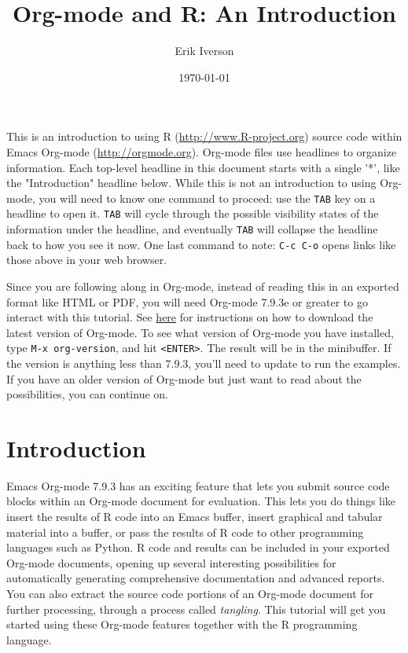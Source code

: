 \documentclass[11pt]{article}
\author{Erik Iverson}
\date{\today}
\title{Org-mode and R: An Introduction}
\begin{document}
\maketitle
\setcounter{tocdepth}{2}
\tableofcontents
\vspace*{1cm}

This is an introduction to using R (\url{http://www.R-project.org}) source code within Emacs Org-mode (\url{http://orgmode.org}). Org-mode files use headlines to organize information. Each top-level headline in this document starts with a single '*', like the "Introduction" headline below. While this is not an introduction to using Org-mode, you will need to know one command to proceed: use the \texttt{TAB} key on a headline to open it. \texttt{TAB} will cycle through the possible visibility states of the information under the headline, and eventually \texttt{TAB} will collapse the headline back to how you see it now. One last command to note: \texttt{C-c C-o} opens links like those above in your web browser.

Since you are following along in Org-mode, instead of reading this in an exported format like HTML or PDF, you will need Org-mode 7.9.3e or greater to go interact with this tutorial. See \href{http://orgmode.org/index.html#sec-3}{here} for instructions on how to download the latest version of Org-mode. To see what version of Org-mode you have installed, type \texttt{M-x org-version}, and hit \texttt{<ENTER>}. The result will be in the minibuffer. If the version is anything less than 7.9.3, you'll need to update to run the examples. If you have an older version of Org-mode but just want to read about the possibilities, you can continue on.

\section*{Introduction}
\label{sec-1}

Emacs Org-mode 7.9.3 has an exciting feature that lets you submit source code blocks within an Org-mode document for evaluation. This lets you do things like insert the results of R code into an Emacs buffer, insert graphical and tabular material into a buffer, or pass the results of R code to other programming languages such as Python. R code and results can be included in your exported Org-mode documents, opening up several interesting possibilities for automatically generating comprehensive documentation and advanced reports. You can also extract the source code portions of an Org-mode document for further processing, through a process called \emph{tangling}. This tutorial will get you started using these Org-mode features together with the R programming language.
\end{document}
